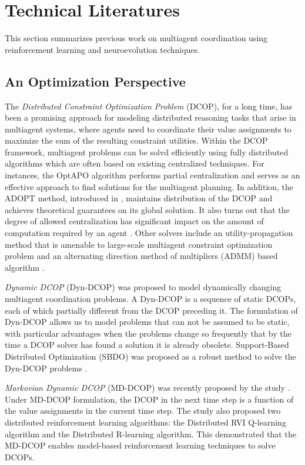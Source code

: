 \documentclass[conference]{IEEEtran}
\begin{document}
\section{Technical Literatures} \label{section:literature}
This section summarizes previous work on multiagent
coordination using reinforcement learning and
neuroevolution techniques.

\subsection{An Optimization Perspective}
The \textit{Distributed Constraint Optimization Problem} (DCOP), for a long
time, has been a promising approach for modeling distributed reasoning tasks
that arise in multiagent systems, where agents need to coordinate their value
assignments to maximize the sum of the resulting constraint utilities.
Within the DCOP framework, multiagent problems can be solvd efficiently
using fully distributed algorithms which are often based on existing
centralized techniques.  For instances, the OptAPO algorithm
\cite{mailler2004solving} performs partial centralization and serves as an
effective approach to find solutions for the multiagent planning.
In addition, the ADOPT method, introduced in \cite{modi2005adopt}, maintains
distribution of the DCOP and achieves theoretical guarantees on its global
solution.
It also turns out that the degree of allowed centralization has significant impact
on the amount of computation required by an agent \cite{davin2005impact}. 
Other solvers include an utility-propagation method that is amenable to
large-scale multiagent constraint optimization problem
\cite{petcu2005scalable} and an alternating direction method of multipliers
(ADMM) based algorithm \cite{boyd2011distributed}.

\textit{Dynamic DCOP} (Dyn-DCOP) was
proposed to model dynamically changing multiagent coordination problems.
A Dyn-DCOP is a sequence of static DCOPs, each of which partially different
from the DCOP preceding it.
The formulation of Dyn-DCOP allows us to model problems that
can not be assumed to be static, with particular advantages when the problems
change so frequently that by the time a DCOP solver has found a solution it is
already obsolete. 
Support-Based Distributed Optimization (SBDO) was proposed as a robust method
to solve the Dyn-DCOP problems \cite{billiau2012sbdo}.

\textit{Markovian Dynamic DCOP} (MD-DCOP) was recently proposed by the study
 \cite{nguyen2014decentralized}. Under MD-DCOP formulation, the DCOP in the
next time step is a function of the value assignments in the current time
step. The study also proposed two distributed
reinforcement learning algorithms: the Distributed RVI Q-learning algorithm
and the Distributed R-learning algorithm. This demonstrated that the MD-DCOP
enables model-based reinforcement learning techniques to solve DCOPs.
\end{document}
